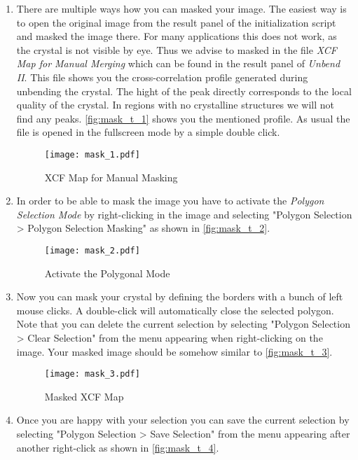 \begin{enumerate}
	\item There are multiple ways how you can masked your image. The easiest way is to open the original image from the result panel of the initialization script and masked the image there. For many applications this does not work, as the crystal is not visible by eye. Thus we advise to masked in the file \textit{XCF Map for Manual Merging} which can be found in the result panel of \textit{Unbend II}. This file shows you the cross-correlation profile generated during unbending the crystal. The hight of the peak directly corresponds to the local quality of the crystal. In regions with no crystalline structures we will not find any peaks. \autoref{fig:mask_t_1} shows you the mentioned profile. As usual the file is opened in the fullscreen mode by a simple double click.
	
	\begin{figure}[H]
		\centering
		\texttt{[image: mask\_1.pdf]}
		\caption{XCF Map for Manual Masking}
		\label{fig:mask_t_1}
	\end{figure}
	
	\item In order to be able to mask the image you have to activate the \textit{Polygon Selection Mode} by right-clicking in the image and selecting "Polygon Selection > Polygon Selection Masking" as shown in \autoref{fig:mask_t_2}.

	\begin{figure}[H]
		\centering
		\texttt{[image: mask\_2.pdf]}
		\caption{Activate the Polygonal Mode}
		\label{fig:mask_t_2}
	\end{figure}
	
	\item Now you can mask your crystal by defining the borders with a bunch of left mouse clicks. A double-click will automatically close the selected polygon. Note that you can delete the current selection by selecting "Polygon Selection > Clear Selection" from the menu appearing when right-clicking on the image. Your masked image should be somehow similar to \autoref{fig:mask_t_3}.
	
	\begin{figure}[H]
		\centering
		\texttt{[image: mask\_3.pdf]}
		\caption{Masked XCF Map}
		\label{fig:mask_t_3}
	\end{figure}
	
	\item Once you are happy with your selection you can save the current selection by selecting "Polygon Selection > Save Selection" from the menu appearing after another right-click as shown in \autoref{fig:mask_t_4}.


\end{enumerate}
